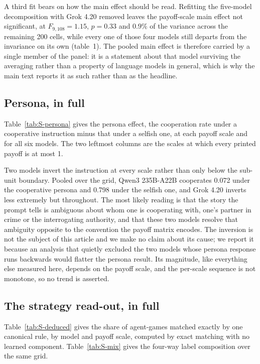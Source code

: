 \documentclass[11pt,a4paper]{article}
\begin{document}
A third fit bears on how the main effect should be read. Refitting the five-model decomposition with Grok 4.20 removed leaves the payoff-scale main effect not significant, at $F_{9,108} = 1.15$, $p = 0.33$ and $0.9\%$ of the variance across the remaining 200 cells, while every one of those four models still departs from the invariance on its own (table~1). The pooled main effect is therefore carried by a single member of the panel: it is a statement about that model surviving the averaging rather than a property of language models in general, which is why the main text reports it as such rather than as the headline.

\subsection{Persona, in full}\label{appendix:persona_full}

Table~\ref{tab:S-persona} gives the persona effect, the cooperation rate under a cooperative instruction minus that under a selfish one, at each payoff scale and for all six models. The two leftmost columns are the scales at which every printed payoff is at most 1.

Two models invert the instruction at every scale rather than only below the sub-unit boundary. Pooled over the grid, Qwen3 235B-A22B cooperates 0.072 under the cooperative persona and 0.798 under the selfish one, and Grok 4.20 inverts less extremely but throughout. The most likely reading is that the story the prompt tells is ambiguous about whom one is cooperating with, one's partner in crime or the interrogating authority, and that these two models resolve that ambiguity opposite to the convention the payoff matrix encodes. The inversion is not the subject of this article and we make no claim about its cause; we report it because an analysis that quietly excluded the two models whose persona response runs backwards would flatter the persona result. Its magnitude, like everything else measured here, depends on the payoff scale, and the per-scale sequence is not monotone, so no trend is asserted.

\subsection{The strategy read-out, in full}\label{appendix:readout_full}

Table~\ref{tab:S-deduced} gives the share of agent-games matched exactly by one canonical rule, by model and payoff scale, computed by exact matching with no learned component. Table~\ref{tab:S-mix} gives the four-way label composition over the same grid.
\end{document}
